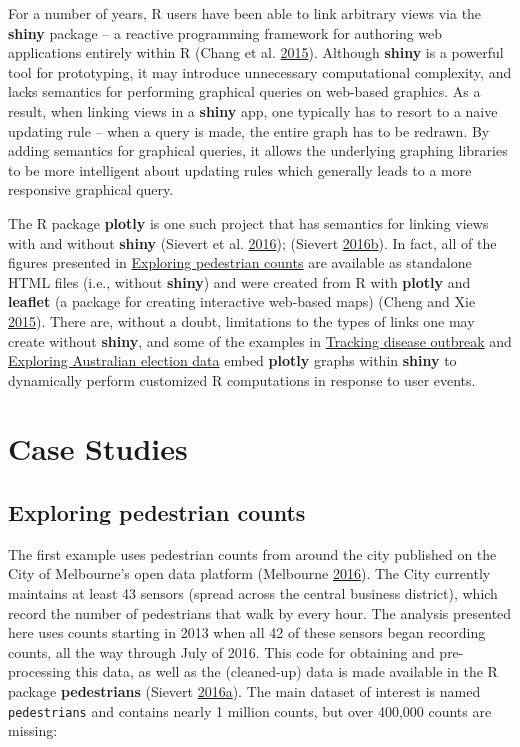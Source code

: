 \documentclass[12pt,]{isuthesis}
\begin{document}
For a number of years, R users have been able to link arbitrary views
via the \textbf{shiny} package -- a reactive programming framework for
authoring web applications entirely within R (Chang et al.
\protect\hyperlink{ref-shiny}{2015}). Although \textbf{shiny} is a
powerful tool for prototyping, it may introduce unnecessary
computational complexity, and lacks semantics for performing graphical
queries on web-based graphics. As a result, when linking views in a
\textbf{shiny} app, one typically has to resort to a naive updating rule
-- when a query is made, the entire graph has to be redrawn. By adding
semantics for graphical queries, it allows the underlying graphing
libraries to be more intelligent about updating rules which generally
leads to a more responsive graphical query.

The R package \textbf{plotly} is one such project that has semantics for
linking views with and without \textbf{shiny} (Sievert et al.
\protect\hyperlink{ref-plotly}{2016}); (Sievert
\protect\hyperlink{ref-plotly-book}{2016}\protect\hyperlink{ref-plotly-book}{b}).
In fact, all of the figures presented in
\protect\hyperlink{exploring-pedestrian-counts}{Exploring pedestrian
counts} are available as standalone HTML files (i.e., without
\textbf{shiny}) and were created from R with \textbf{plotly} and
\textbf{leaflet} (a package for creating interactive web-based maps)
(Cheng and Xie \protect\hyperlink{ref-leaflet}{2015}). There are,
without a doubt, limitations to the types of links one may create
without \textbf{shiny}, and some of the examples in
\protect\hyperlink{Tracking-disease-outbreak}{Tracking disease outbreak}
and \protect\hyperlink{exploring-australian-election-data}{Exploring
Australian election data} embed \textbf{plotly} graphs within
\textbf{shiny} to dynamically perform customized R computations in
response to user events.

\section{Case Studies}\label{case-studies}

\hypertarget{exploring-pedestrian-counts}{\subsection{Exploring
pedestrian counts}\label{exploring-pedestrian-counts}}

The first example uses pedestrian counts from around the city published
on the City of Melbourne's open data platform (Melbourne
\protect\hyperlink{ref-melbourne}{2016}). The City currently maintains
at least 43 sensors (spread across the central business district), which
record the number of pedestrians that walk by every hour. The analysis
presented here uses counts starting in 2013 when all 42 of these sensors
began recording counts, all the way through July of 2016. This code for
obtaining and pre-processing this data, as well as the (cleaned-up) data
is made available in the R package \textbf{pedestrians} (Sievert
\protect\hyperlink{ref-pedestrians}{2016}\protect\hyperlink{ref-pedestrians}{a}).
The main dataset of interest is named \texttt{pedestrians} and contains
nearly 1 million counts, but over 400,000 counts are missing:
\end{document}
